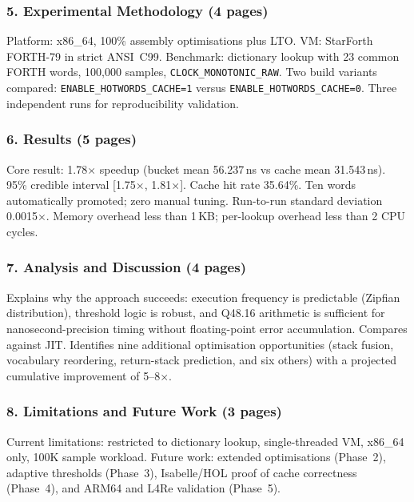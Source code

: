 \subsubsection{5. Experimental Methodology (4 pages)}

Platform: x86\_64, 100\% assembly optimisations plus LTO. VM: StarForth
FORTH-79 in strict ANSI~C99. Benchmark: dictionary lookup with 23 common
FORTH words, 100,000 samples, \texttt{CLOCK\_MONOTONIC\_RAW}. Two
build variants compared: \texttt{ENABLE\_HOTWORDS\_CACHE=1} versus
\texttt{ENABLE\_HOTWORDS\_CACHE=0}. Three independent runs for
reproducibility validation.

\subsubsection{6. Results (5 pages)}

Core result: 1.78$\times$ speedup (bucket mean 56.237\,ns vs cache mean
31.543\,ns). 95\% credible interval [1.75$\times$, 1.81$\times$]. Cache
hit rate 35.64\%. Ten words automatically promoted; zero manual tuning.
Run-to-run standard deviation 0.0015$\times$. Memory overhead less than
1\,KB; per-lookup overhead less than 2 CPU cycles.

\subsubsection{7. Analysis and Discussion (4 pages)}

Explains why the approach succeeds: execution frequency is predictable
(Zipfian distribution), threshold logic is robust, and Q48.16 arithmetic
is sufficient for nanosecond-precision timing without floating-point error
accumulation. Compares against JIT. Identifies nine additional optimisation
opportunities (stack fusion, vocabulary reordering, return-stack prediction,
and six others) with a projected cumulative improvement of 5--8$\times$.

\subsubsection{8. Limitations and Future Work (3 pages)}

Current limitations: restricted to dictionary lookup, single-threaded VM,
x86\_64 only, 100K sample workload. Future work: extended optimisations
(Phase~2), adaptive thresholds (Phase~3), Isabelle/HOL proof of cache
correctness (Phase~4), and ARM64 and L4Re validation (Phase~5).

